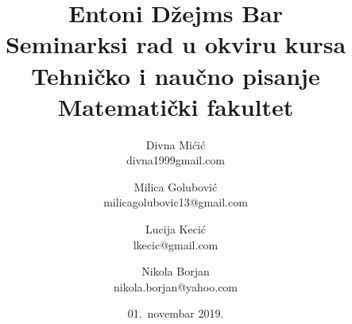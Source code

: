 \documentclass[a4paper]{article}
\begin{document}
	
	\title{Entoni Džejms Bar\\ \small{Seminarksi rad u okviru kursa\\Tehničko i naučno pisanje\\Matematički fakultet}}
	
	\author{Divna Mićić\\ divna1999gmail.com \and
		Milica Golubović \\ milicagolubovic13@gmail.com \and
		Lucija Kecić \\ lkecic@gmail.com \and
		Nikola Borjan \\ nikola.borjan@yahoo.com} 
	
	\date{01.~novembar 2019.}
	
	\maketitle
	
	
	
\end{document}
